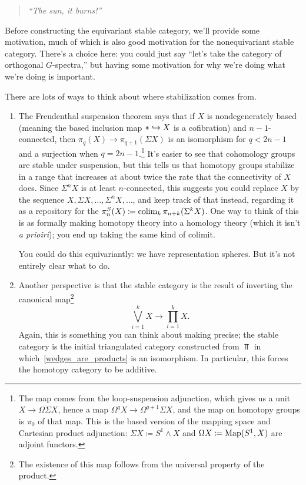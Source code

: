 \begin{quote}\textit{
	``The sun, it burns!''
}\end{quote}

Before constructing the equivariant stable category, we'll provide some motivation, much of which is also good
motivation for the nonequivariant stable category. There's a choice here: you could just say ``let's take the
category of orthogonal $G$-spectra,'' but having some motivation for why we're doing what we're doing is important.

There are lots of ways to think about where stabilization comes from.
\begin{enumerate}
	\item The Freudenthal suspension theorem says that if $X$ is nondegenerately based (meaning the based inclusion
	map $*\hookrightarrow X$ is a cofibration) and $n-1$-connected, then $\pi_q(X)\to\pi_{q+1}(\Sigma
	X)$ is an isomorphism for $q < 2n-1$ and a surjection when $q = 2n-1$.\footnote{The map comes from the
	loop-suspension adjunction, which gives us a unit $X\to\Omega\Sigma X$, hence a map
	$\Omega^qX\to\Omega^{q+1}\Sigma X$, and the map on homotopy groups is $\pi_0$ of that map. This is the based
	version of the mapping space and Cartesian product adjunction: $\Sigma X\coloneqq S^1\wedge X$ and $\Omega X
	\coloneqq \operatorname{Map}(S^1, X)$ are adjoint functors.} It's easier to see that cohomology groups are stable under
	suspension, but this tells us that homotopy groups stabilize in a range that increases at about twice the rate
	that the connectivity of $X$ does. Since $\Sigma^n X$ is at least $n$-connected, this suggests you could
	replace $X$ by the sequence $X, \Sigma X,\dotsc,\Sigma^n X,\dotsc$, and keep track of that instead, regarding
	it as a repository for the  $\pi_n^S(X)\coloneqq\operatorname*{colim}_k \pi_{n+k}(\Sigma^k X)$.
	One way to think of this is as formally making homotopy theory into a homology theory (which it isn't \textit{a
	prioiri}); you end up taking the same kind of colimit.

	You could do this equivariantly: we have representation spheres. But it's not entirely clear what to do.
	\item Another perspective is that the stable category is the result of inverting the canonical map\footnote{The
	existence of this map follows from the universal property of the product.}
	\begin{equation}
	\label{wedges_are_products}
	\bigvee_{i=1}^k X\to\prod_{i=1}^k X.
	\end{equation}
	Again, this is something you can think about making precise; the stable category is the initial triangulated
	category constructed from $\Top$ in which~\eqref{wedges_are_products} is an isomorphism. In particular, this
	forces the homotopy category to be additive.


\end{enumerate}

